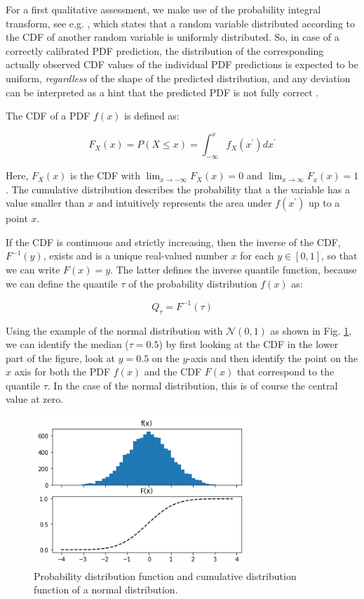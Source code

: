 \documentclass[BCOR=1mm, DIV=calc,10pt,
twoside=true,
twocolumn,
headings=normal]{scrartcl}
\newcommand{\fig}{Fig. }
\begin{document}
For a first qualitative assessment, we make use of the probability integral transform, see e.g. \cite{Angus1994,casella2002statistical}, which states that a random variable distributed according to the CDF of another random variable is uniformly distributed. So, in case of a correctly calibrated PDF prediction, the distribution of the corresponding actually observed CDF values of the individual PDF predictions is expected to be uniform, {\em regardless} of the shape of the predicted distribution, and any deviation can be interpreted as a hint that the predicted PDF is not fully correct \cite{diebold1998vevaluating}.

The CDF of a PDF $f(x)$ is defined as:

\begin{equation}
\label{eqn:CDF}
F_X(x) = P(X \le x) = \int_{-\infty}^{x} f_X(x^\prime) dx^\prime
\end{equation}

Here, $F_X(x)$ is the CDF with $\lim_{x \to -\infty}F_X(x) = 0$ and $\lim_{x \to \infty}F_x(x) = 1$. The cumulative distribution describes the probability that a the variable has a value smaller than $x$ and intuitively represents the area under $f(x^\prime)$ up to a point $x$.

If the CDF is continuous and strictly increasing, then the inverse of the CDF, $F^{-1}(y)$, exists and is a unique real-valued number $x$ for each $y \in [0,1]$, so that we can write $F(x) = y$. The latter defines the inverse quantile function, because we can define the quantile $\tau$ of the probability distribution $f(x)$ as:

\begin{equation}
Q_\tau = F^{-1}(\tau)
\end{equation}

Using the example of the normal distribution with $\mathcal{N}(0,1)$ as shown in \fig \ref{fig:PdfCdf}, we can identify the median ($\tau = 0.5$) by first looking at the CDF in the lower part of the figure, look at $y=0.5$ on the $y$-axis and then identify the point on the $x$ axis for both the PDF $f(x)$ and the CDF $F(x)$ that correspond to the quantile $\tau$. In the case of the normal distribution, this is of course the central value at zero.

\begin{figure}
\begin{center}
\includegraphics[width=8cm]{../figures/PdfCdf}
\caption{\label{fig:PdfCdf} Probability distribution function and cumulative distribution function of a normal distribution.}
\end{center}
\end{figure}
\end{document}
